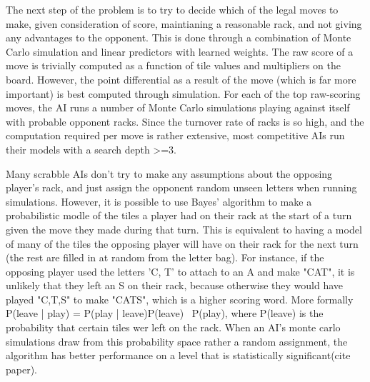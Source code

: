 \documentclass[12pt]{article}
\begin{document}
{%


The next step of the problem is to try to decide which of the legal moves to make, given consideration of score, maintianing a reasonable rack, and not giving any advantages to the opponent. This is done through a combination of Monte Carlo simulation and linear predictors with learned weights.  The raw score of a move is trivially computed as a function of tile values and multipliers on the board. However, the point differential as a result of the move (which is far more important) is best computed through simulation.  For each of the top raw-scoring moves, the AI runs a number of Monte Carlo simulations playing against itself with probable opponent racks. Since the turnover rate of racks is so high, and the computation required per move is rather extensive, most competitive AIs run their models with a search depth >=3. 

	Many scrabble AIs don't try to make any assumptions about the opposing player's rack, and just assign the opponent random unseen letters when running simulations. However, it is possible to use Bayes' algorithm to make a probabilistic modle of the tiles a player had on their rack at the start of a turn given the move they made during that turn. This is equivalent to having a model of many of the tiles the opposing player will have on their rack for the next turn (the rest are filled in at random from the letter bag). For instance, if the opposing player used the letters 'C, T' to attach to an A and make "CAT", it is unlikely that they left an S on their rack, because otherwise they would have played "C,T,S" to make "CATS", which is a higher scoring word. More formally P(leave | play) = P(play | leave)P(leave) \ P(play), where P(leave) is the probability that certain tiles wer left on the rack. When an AI's monte carlo simulations draw from this probability space rather a random assignment, the algorithm has better performance on a level that is statistically significant(cite paper). 
	
}
\end{document}
